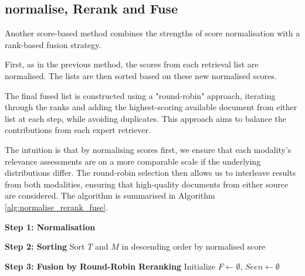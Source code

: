 \documentclass[12pt,twoside]{report}
\begin{document}
\subsection{normalise, Rerank and Fuse}

Another score-based method combines the strengths of score normalisation with a rank-based fusion strategy.

First, as in the previous method, the scores from each retrieval list are normalised. The lists are then sorted based on these new normalised scores.

The final fused list is constructed using a "round-robin" approach, iterating through the ranks and adding the highest-scoring available document from either list at each step, while avoiding duplicates. This approach aims to balance the contributions from each expert retriever.

The intuition is that by normalising scores first, we ensure that each modality's relevance assessments are on a more comparable scale if the underlying distributions differ. The round-robin selection then allows us to interleave results from both modalities, ensuring that high-quality documents from either source are considered. The algorithm is summarised in Algorithm \ref{alg:normalise_rerank_fuse}.

\begin{algorithm}[t!h]
\DontPrintSemicolon
\caption{normalise, Rerank and Fuse Across Modalities}
\label{alg:normalise_rerank_fuse}
\BlankLine

\BlankLine
\textbf{Step 1: Normalisation}\;

\BlankLine
\textbf{Step 2: Sorting}\;
Sort $T$ and $M$ in descending order by normalised score\;

\BlankLine
\textbf{Step 3: Fusion by Round-Robin Reranking}\;
Initialize $F \gets \emptyset$, $Seen \gets \emptyset$\;

\BlankLine
{}\;
\end{algorithm}
\end{document}
